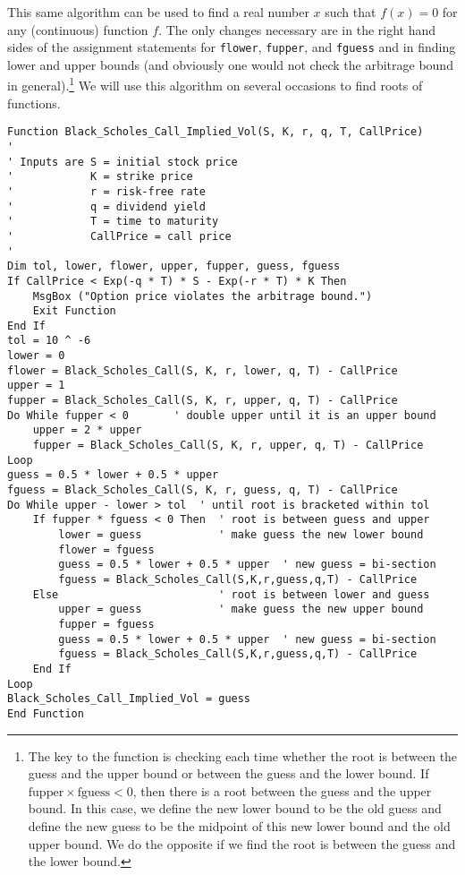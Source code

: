 \newpage

This same algorithm can be used to find a real number $x$ such that $f(x)=0$ for any (continuous) function $f$.  The only changes necessary are in the right hand sides of the assignment statements for \verb!flower!, \verb!fupper!, and \verb!fguess! and in finding lower and upper bounds (and obviously one would not check the arbitrage bound in general).\footnote{The key to the function  is checking each time whether the root is between the guess and the upper bound or between the guess and the lower bound.  If $\text{fupper} \times \text{fguess} < 0$, then there is a root between the guess and the upper bound.  In this case, we define the new lower bound to be the old  guess and define the new guess to be the midpoint of this new lower bound and the old upper bound.  We do the opposite if we find the root is between the guess and the lower bound.}  We will use this algorithm on several occasions to find roots of functions.

\small\begin{verbatim}
Function Black_Scholes_Call_Implied_Vol(S, K, r, q, T, CallPrice)
'
' Inputs are S = initial stock price
'            K = strike price
'            r = risk-free rate
'            q = dividend yield
'            T = time to maturity
'            CallPrice = call price
'
Dim tol, lower, flower, upper, fupper, guess, fguess
If CallPrice < Exp(-q * T) * S - Exp(-r * T) * K Then
    MsgBox ("Option price violates the arbitrage bound.")
    Exit Function
End If
tol = 10 ^ -6
lower = 0
flower = Black_Scholes_Call(S, K, r, lower, q, T) - CallPrice
upper = 1
fupper = Black_Scholes_Call(S, K, r, upper, q, T) - CallPrice
Do While fupper < 0       ' double upper until it is an upper bound
    upper = 2 * upper
    fupper = Black_Scholes_Call(S, K, r, upper, q, T) - CallPrice
Loop
guess = 0.5 * lower + 0.5 * upper
fguess = Black_Scholes_Call(S, K, r, guess, q, T) - CallPrice
Do While upper - lower > tol  ' until root is bracketed within tol
    If fupper * fguess < 0 Then  ' root is between guess and upper
        lower = guess            ' make guess the new lower bound
        flower = fguess
        guess = 0.5 * lower + 0.5 * upper  ' new guess = bi-section
        fguess = Black_Scholes_Call(S,K,r,guess,q,T) - CallPrice
    Else                         ' root is between lower and guess
        upper = guess            ' make guess the new upper bound
        fupper = fguess
        guess = 0.5 * lower + 0.5 * upper  ' new guess = bi-section
        fguess = Black_Scholes_Call(S,K,r,guess,q,T) - CallPrice
    End If
Loop
Black_Scholes_Call_Implied_Vol = guess
End Function
\end{verbatim}\normalsize

